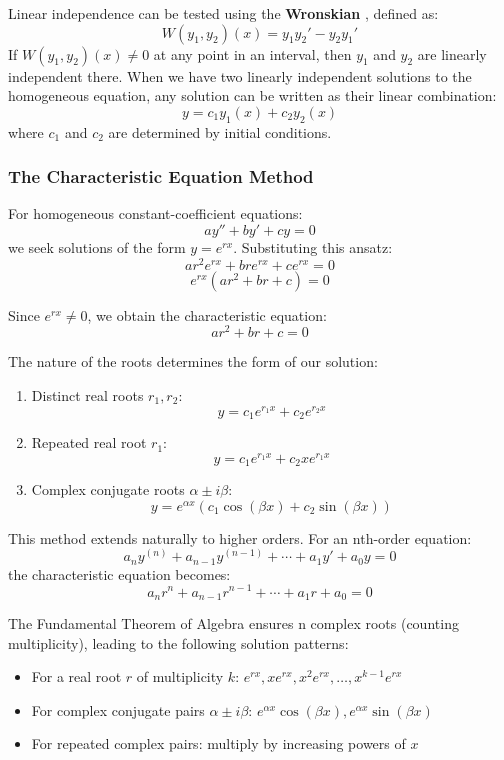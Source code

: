 \noindent Linear independence can be tested using the \textbf{Wronskian} , defined as:
\[
W(y_1, y_2)(x) = y_1y_2' - y_2y_1'
\]
If $W(y_1, y_2)(x) \neq 0$ at any point in an interval, then $y_1$ and $y_2$ are linearly independent there. When we have two linearly independent solutions to the homogeneous equation, any solution can be written as their linear combination:
\[
y = c_1y_1(x) + c_2y_2(x)
\]
where $c_1$ and $c_2$ are determined by initial conditions.

\subsubsection*{The Characteristic Equation Method} 

\noindent For homogeneous constant-coefficient equations:
\[
ay'' + by' + cy = 0
\]
we seek solutions of the form $y = e^{rx}$. Substituting this ansatz:
\[
ar^2e^{rx} + bre^{rx} + ce^{rx} = 0
\]
\[
e^{rx}(ar^2 + br + c) = 0
\]

\noindent Since $e^{rx} \neq 0$, we obtain the characteristic equation:
\[
ar^2 + br + c = 0
\]

\noindent The nature of the roots determines the form of our solution:

\begin{enumerate}
    \item Distinct real roots $r_1, r_2$:
    \[
    y = c_1e^{r_1x} + c_2e^{r_2x}
    \]
    
    \item Repeated real root $r_1$:
    \[
    y = c_1e^{r_1x} + c_2xe^{r_1x}
    \]
    
    \item Complex conjugate roots $\alpha \pm i\beta$:
    \[
    y = e^{\alpha x}(c_1\cos(\beta x) + c_2\sin(\beta x))
    \]
\end{enumerate}

\noindent This method extends naturally to higher orders. For an nth-order equation:
\[
a_ny^{(n)} + a_{n-1}y^{(n-1)} + \cdots + a_1y' + a_0y = 0
\]
the characteristic equation becomes:
\[
a_nr^n + a_{n-1}r^{n-1} + \cdots + a_1r + a_0 = 0
\]

\noindent The Fundamental Theorem of Algebra ensures n complex roots (counting multiplicity), leading to the following solution patterns:
\begin{itemize}
    \item For a real root $r$ of multiplicity $k$: $e^{rx}, xe^{rx}, x^2e^{rx}, \ldots, x^{k-1}e^{rx}$
    \item For complex conjugate pairs $\alpha \pm i\beta$: $e^{\alpha x}\cos(\beta x), e^{\alpha x}\sin(\beta x)$
    \item For repeated complex pairs: multiply by increasing powers of $x$
\end{itemize}

